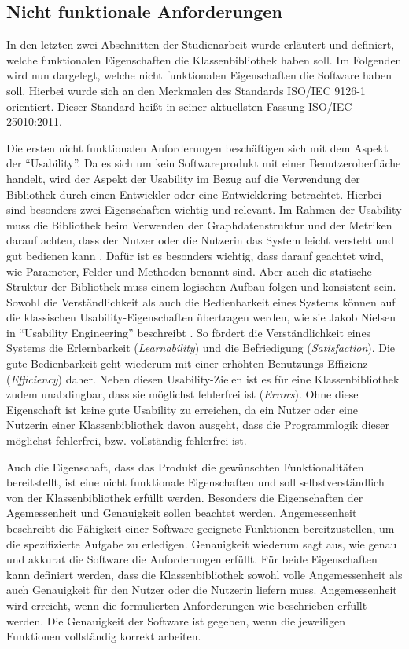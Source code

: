 \documentclass[a4paper,12pt,ngerman,chapterprefix=false,listof=totoc,bibliography=totoc]{scrreprt}
\begin{document}
{{\subsection{Nicht funktionale Anforderungen}
{
In den letzten zwei Abschnitten der Studienarbeit wurde erläutert und definiert, welche funktionalen Eigenschaften die Klassenbibliothek haben soll. Im Folgenden wird nun dargelegt, welche nicht funktionalen Eigenschaften die Software haben soll. Hierbei wurde sich an den Merkmalen des Standards ISO/IEC 9126-1 orientiert. \cite{balzert_lehrbuch_2009} Dieser Standard heißt in seiner aktuellsten Fassung ISO/IEC 25010:2011.

Die ersten nicht funktionalen Anforderungen beschäftigen sich mit dem Aspekt der "`Usability"'. Da es sich um kein Softwareprodukt mit einer Benutzeroberfläche handelt, wird der Aspekt der Usability im Bezug auf die Verwendung der Bibliothek durch einen Entwickler oder eine Entwicklering betrachtet. Hierbei sind besonders zwei Eigenschaften wichtig und relevant. Im Rahmen der Usability muss die Bibliothek beim Verwenden der Graphdatenstruktur und der Metriken darauf achten, dass der Nutzer oder die Nutzerin das System leicht versteht und gut bedienen kann \cite{balzert_lehrbuch_2009}. Dafür ist es besonders wichtig, dass darauf geachtet wird, wie Parameter, Felder und Methoden benannt sind. Aber auch die statische Struktur der Bibliothek muss einem logischen Aufbau folgen und konsistent sein. Sowohl die Verständlichkeit als auch die Bedienbarkeit eines Systems können auf die klassischen Usability-Eigenschaften übertragen werden, wie sie Jakob Nielsen in "`Usability Engineering"' beschreibt \cite{nielsen_usability_2010}. So fördert die Verständlichkeit eines Systems die Erlernbarkeit (\textit{Learnability}) und die Befriedigung (\textit{Satisfaction}). Die gute Bedienbarkeit geht wiederum mit einer erhöhten Benutzungs-Effizienz (\textit{Efficiency}) daher. Neben diesen Usability-Zielen ist es für eine Klassenbibliothek zudem unabdingbar, dass sie möglichst fehlerfrei ist (\textit{Errors}). Ohne diese Eigenschaft ist keine gute Usability zu erreichen, da ein Nutzer oder eine Nutzerin einer Klassenbibliothek davon ausgeht, dass die Programmlogik dieser möglichst fehlerfrei, bzw. vollständig fehlerfrei ist.

Auch die Eigenschaft, dass das Produkt die gewünschten Funktionalitäten bereitstellt, ist eine nicht funktionale Eigenschaften und soll selbstverständlich von der Klassenbibliothek erfüllt werden. Besonders die Eigenschaften der Agemessenheit und Genauigkeit sollen beachtet werden. Angemessenheit beschreibt die Fähigkeit einer Software geeignete Funktionen bereitzustellen, um die spezifizierte Aufgabe zu erledigen. Genauigkeit wiederum sagt aus, wie genau und akkurat die Software die Anforderungen erfüllt. Für beide Eigenschaften kann definiert werden, dass die Klassenbibliothek sowohl volle Angemessenheit als auch Genauigkeit für den Nutzer oder die Nutzerin liefern muss. Angemessenheit wird erreicht, wenn die formulierten Anforderungen wie beschrieben erfüllt werden. Die Genauigkeit der Software ist gegeben, wenn die jeweiligen Funktionen vollständig korrekt arbeiten.

}}}
\end{document}
